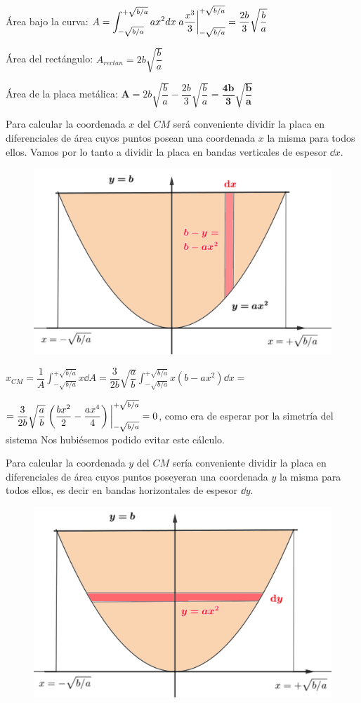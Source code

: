 Área bajo la curva:
$\displaystyle A=\int_{-\sqrt{b/a}}^{+\sqrt{b/a}} ax^2 dx \eval{a \dfrac {x^3}{3}}_{-\sqrt{b/a}}^{+\sqrt{b/a}}=\dfrac {2b}{3}\sqrt{\dfrac{b}{a}}$

Área del rectángulo: $A_{rectan}=2b\sqrt{\dfrac b a}$

Área de la placa metálica: $\boldsymbol{A}=2b\sqrt{\dfrac b a}- \dfrac{2b}3 \sqrt{\dfrac b a}=\boldsymbol{\dfrac{4b}{3} \sqrt{\dfrac b a}}$

\begin{multicols}{2}
Para calcular la coordenada $x$ del $CM$ será conveniente dividir la placa en diferenciales de área cuyos puntos posean una coordenada $x$ la misma para todos ellos. Vamos por lo tanto a dividir la placa en bandas verticales de espesor $\dd x$. 
\begin{figure}[H]
	\centering
	\includegraphics[width=.5\textwidth]{imagenes/imagenes12/T12IM08.png}
\end{figure}
\end{multicols}

$\displaystyle x_{CM}=\dfrac 1 A \int_{-\sqrt{b/a}}^{+\sqrt{b/a}} x \dd A = \dfrac {3}{2b} \sqrt{\dfrac a b} \int_{-\sqrt{b/a}}^{+\sqrt{b/a}} x(b-ax^2) \dd x = $

$=\dfrac {3}{2b} \sqrt{\dfrac a b}\eval{\left( \dfrac {bx^2}{2} - \dfrac  {ax^4}{4} \right) }_{-\sqrt{b/a}}^{+\sqrt{b/a}} = 0$, como era de esperar por la simetría del sistema \textcolor{gris}{Nos hubiésemos podido evitar este cálculo.}

\begin{multicols}{2}
Para calcular la coordenada $y$ del $CM$ sería conveniente dividir la placa en diferenciales de área cuyos puntos poseyeran una coordenada $y$ la misma para todos ellos, es decir en bandas horizontales de espesor $\dd y$. 
\begin{figure}[H]
	\centering
	\includegraphics[width=.5\textwidth]{imagenes/imagenes12/T12IM09.png}
\end{figure}
\end{multicols}

